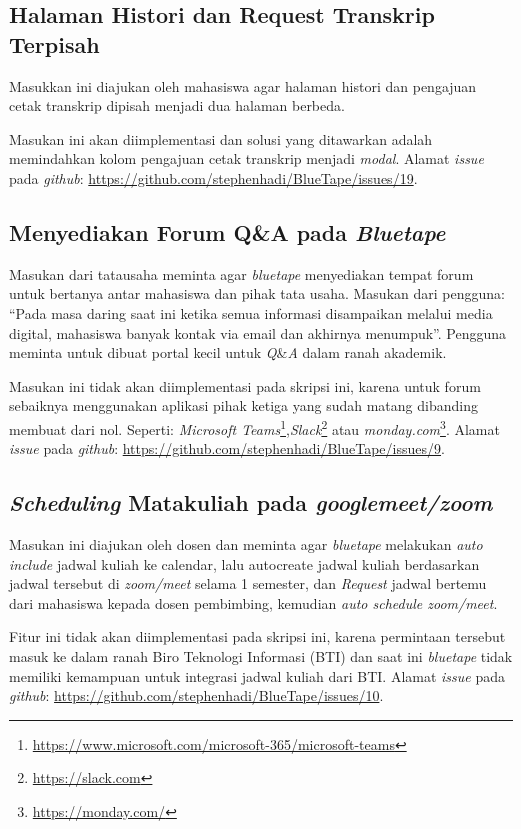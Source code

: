 \subsection{Halaman Histori dan Request Transkrip Terpisah}
\label{issue:19}
Masukkan ini diajukan oleh mahasiswa agar halaman histori dan pengajuan cetak transkrip dipisah menjadi dua halaman berbeda. 

Masukan ini akan diimplementasi dan solusi yang ditawarkan adalah memindahkan kolom pengajuan cetak transkrip menjadi \textit{modal}. Alamat \textit{issue} pada \textit{github}: \url{https://github.com/stephenhadi/BlueTape/issues/19}.

\subsection{Menyediakan Forum Q\&A pada \textit{Bluetape}}
\label{issue:9}
Masukan dari tatausaha meminta agar \textit{bluetape} menyediakan tempat forum untuk bertanya antar mahasiswa dan pihak tata usaha. Masukan dari pengguna: ``Pada masa daring saat ini ketika semua informasi disampaikan melalui media digital, mahasiswa banyak kontak via email dan akhirnya menumpuk''.  Pengguna meminta untuk dibuat portal kecil untuk \textit{Q}\&\textit{A} dalam ranah akademik.

Masukan ini tidak akan diimplementasi pada skripsi ini, karena untuk forum sebaiknya menggunakan aplikasi pihak ketiga yang sudah matang dibanding membuat dari nol. Seperti: \textit{Microsoft Teams}\footnote{\url{https://www.microsoft.com/microsoft-365/microsoft-teams}},\textit{Slack}\footnote{\url{https://slack.com}} atau \textit{monday.com}\footnote{\url{https://monday.com/}}. Alamat \textit{issue} pada \textit{github}: \url{https://github.com/stephenhadi/BlueTape/issues/9}. 

\subsection{\textit{Scheduling} Matakuliah pada \textit{googlemeet/zoom}}
\label{issue:10}
Masukan ini diajukan oleh dosen dan meminta agar \textit{bluetape} melakukan \textit{auto include} jadwal kuliah ke calendar, lalu {autocreate} jadwal kuliah berdasarkan jadwal tersebut di \textit{zoom/meet} selama 1 semester, dan \textit{Request} jadwal bertemu dari mahasiswa kepada dosen pembimbing, kemudian \textit{auto schedule zoom/meet}.

Fitur ini tidak akan diimplementasi pada skripsi ini, karena permintaan tersebut masuk ke dalam ranah Biro Teknologi Informasi (BTI) dan saat ini \textit{bluetape} tidak memiliki kemampuan untuk integrasi jadwal kuliah dari BTI. Alamat \textit{issue} pada \textit{github}: \url{https://github.com/stephenhadi/BlueTape/issues/10}. 


